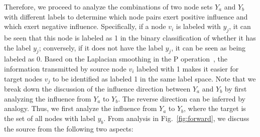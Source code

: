 Therefore, we proceed to analyze the combinations of two node sets $Y_a$ and $Y_b$ with different labels to determine which node pairs exert positive influence and which exert negative influence.
Specifically, if a node $v_i$ is labeled with $y_j$, it can be seen that this node is labeled as 1 in the binary classification of whether it has the label $y_j$; conversely, if it does not have the label $y_j$, it can be seen as being labeled as 0.
Based on the Laplacian smoothing in the P operation~\citep{zhang2022model}, the information transmitted by source node $v_i$ labeled with 1 makes it easier for target nodes $v_j$ to be identified as labeled 1 in the same label space.
Note that we break down the discussion of the influence direction between $Y_a$ and $Y_b$ by first analyzing the influence from $Y_a$ to $Y_b$. 
The reverse direction can be inferred by analogy.
Thus, we first analyze the influence from $Y_a$ to $Y_b$, where the target is the set of all nodes with label $y_b$. 
From analysis in Fig.~\ref{fig:forward}, we discuss the source from the following two aspects: 

